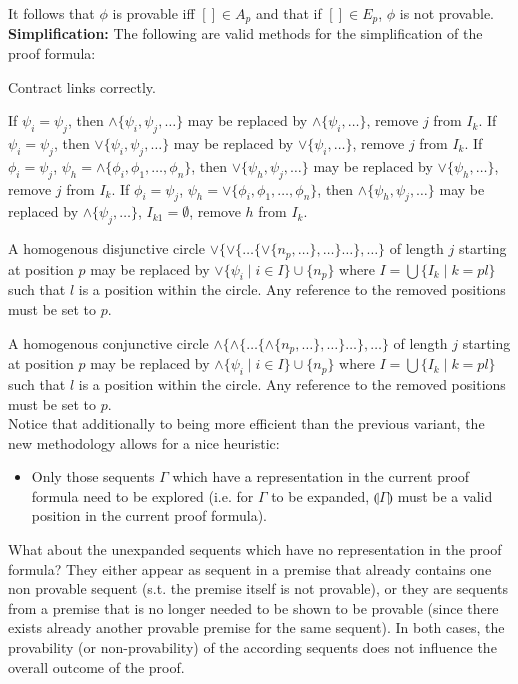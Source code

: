 \documentclass{llncs}
\newcommand{\ind}[1]{\llparenthesis #1 \rrparenthesis}
\begin{document}
It follows that $\phi$ is provable iff $[]\in A_p$ and that if $[]\in E_p$, $\phi$ is not provable.\\

\noindent\textbf{Simplification:} The following are valid methods for the simplification of the proof formula:

Contract links correctly.

If $\psi_i=\psi_j$, then $\wedge\{\psi_i,\psi_j,\ldots\}$ may be replaced by $\wedge\{\psi_i,\ldots\}$,
remove $j$ from $I_k$. If $\psi_i=\psi_j$, then $\vee\{\psi_i,\psi_j,\ldots\}$ may be replaced by $\vee\{\psi_i,\ldots\}$,
remove $j$ from $I_k$. If $\phi_i=\psi_j$, $\psi_h=\wedge\{\phi_i,\phi_1,\ldots,\phi_n\}$, then $\vee\{\psi_h,\psi_j,\ldots\}$
may be replaced by $\vee\{\psi_h,\ldots\}$, remove $j$ from $I_{k}$.
If $\phi_i=\psi_j$, $\psi_h=\vee\{\phi_i,\phi_1,\ldots,\phi_n\}$, then $\wedge\{\psi_h,\psi_j,\ldots\}$
may be replaced by $\wedge\{\psi_j,\ldots\}$, $I_{k1}=\emptyset$, remove $h$ from $I_k$.

A homogenous disjunctive circle $\vee\{\vee\{\ldots\{\vee\{n_p,\ldots\},\ldots\}\ldots\},\ldots\}$ of length $j$ starting at
position $p$ may be replaced by $\vee\{\psi_i\mid i\in I\}\cup\{n_p\}$ where $I=\bigcup\{I_k\mid k=pl\}$ such that $l$ is a position
within the circle. Any reference to the removed positions must be set to $p$.

A homogenous conjunctive circle $\wedge\{\wedge\{\ldots\{\wedge\{n_p,\ldots\},\ldots\}\ldots\},\ldots\}$ of length $j$ starting at
position $p$ may be replaced by $\wedge\{\psi_i\mid i\in I\}\cup\{n_p\}$ where $I=\bigcup\{I_k\mid k=pl\}$ such that $l$ is a position
within the circle. Any reference to the removed positions must be set to $p$.\\

\noindent Notice that additionally to being more efficient than the previous variant, the new
methodology allows for a nice heuristic:
\begin{itemize}
\item Only those sequents $\Gamma$ which
have a representation in the current proof formula need to be explored (i.e. for $\Gamma$
to be expanded, $\ind{\Gamma}$ must be a valid position in the current proof formula). 
\end{itemize}
What about the unexpanded sequents which have no representation in the proof formula?
They either appear as sequent in a premise that already contains one
non provable sequent (s.t. the premise itself is not provable), or they are sequents
from a premise that is no longer needed to be shown to be provable (since there exists
already another provable premise for the same sequent). In both cases, the provability
(or non-provability) of the according sequents does not influence the overall outcome
of the proof.
\end{document}
